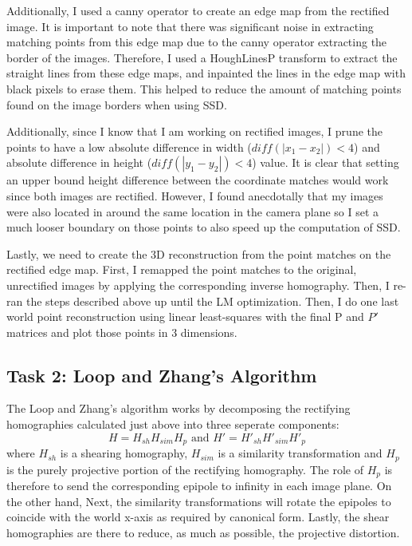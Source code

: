 \documentclass{article}
\begin{document}
Additionally, I used a canny operator to create an edge map from the rectified image. It is important to note that there was significant noise in extracting matching points from this edge map due to the canny operator extracting the border of the images. Therefore, I used a HoughLinesP transform to extract the straight lines from these edge maps, and inpainted the lines in the edge map with black pixels to erase them. This helped to reduce the amount of matching points found on the image borders when using SSD. 

Additionally, since I know that I am working on rectified images, I prune the points to have a low absolute difference in width ($diff\left(|x_1-x_2|\right)<4$) and absolute difference in height ($diff\left(|y_1-y_2|\right)<4$) value. It is clear that setting an upper bound height difference between the coordinate matches would work since both images are rectified. However, I found anecdotally that my images were also located in around the same location in the camera plane so I set a much looser boundary on those points to also speed up the computation of SSD.

Lastly, we need to create the 3D reconstruction from the point matches on the rectified edge map. First, I remapped the point matches to the original, unrectified images by applying the corresponding inverse homography. Then, I re-ran the steps described above up until the LM optimization. Then, I do one last world point reconstruction using linear least-squares with the final P and $P'$ matrices and plot those points in 3 dimensions. 

\subsection{Task 2: Loop and Zhang's Algorithm}
The Loop and Zhang's algorithm works by decomposing the rectifying homographies calculated just above into three
seperate components:
\[H = H_{sh} H_{sim} H_{p} \text{ and } H' = H'_{sh} H'_{sim} H'_{p}\]
where $H_{sh}$ is a shearing homography, $H_{sim}$ is a similarity transformation and $H_p$ is the purely projective portion of the
rectifying homography. The role of $H_p$ is therefore to send the corresponding epipole to infinity in each image plane. On the other hand,
Next, the similarity transformations will rotate the epipoles to coincide with the world x-axis as required by canonical form. Lastly,
the shear homographies are there to reduce, as much as possible, the projective distortion.
\end{document}
